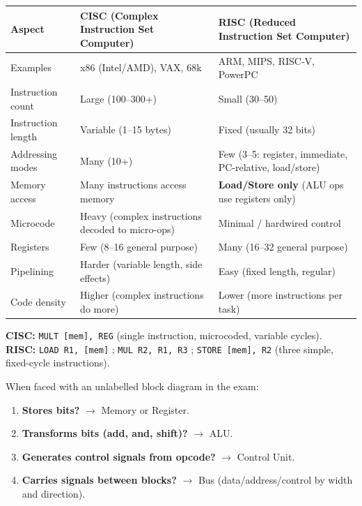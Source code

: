 \documentclass[11pt]{article}
\begin{document}
\begin{center}
\begin{tabularx}{\linewidth}{|l|X|X|}\hline
\rowcolor{popblueL}
\textbf{Aspect} & \textbf{CISC (Complex Instruction Set Computer)} & \textbf{RISC (Reduced Instruction Set Computer)} \\ \hline
Examples & x86 (Intel/AMD), VAX, 68k & ARM, MIPS, RISC-V, PowerPC \\ \hline
Instruction count & Large (100--300+) & Small (30--50) \\ \hline
Instruction length & Variable (1--15 bytes) & Fixed (usually 32 bits) \\ \hline
Addressing modes & Many (10+) & Few (3--5: register, immediate, PC-relative, load/store) \\ \hline
Memory access & Many instructions access memory & \textbf{Load/Store only} (ALU ops use registers only) \\ \hline
Microcode & Heavy (complex instructions decoded to micro-ops) & Minimal / hardwired control \\ \hline
Registers & Few (8--16 general purpose) & Many (16--32 general purpose) \\ \hline
Pipelining & Harder (variable length, side effects) & Easy (fixed length, regular) \\ \hline
Code density & Higher (complex instructions do more) & Lower (more instructions per task) \\ \hline
\end{tabularx}
\end{center}

\begin{exemplebox}
\textbf{CISC:} \texttt{MULT [mem], REG} (single instruction, microcoded, variable cycles).\\
\textbf{RISC:} \texttt{LOAD R1, [mem]} ; \texttt{MUL R2, R1, R3} ; \texttt{STORE [mem], R2} (three simple, fixed-cycle instructions).
\end{exemplebox}

\begin{methode}
When faced with an unlabelled block diagram in the exam:
\begin{enumerate}
\item \textbf{Stores bits?} $\rightarrow$ Memory or Register.
\item \textbf{Transforms bits (add, and, shift)?} $\rightarrow$ ALU.
\item \textbf{Generates control signals from opcode?} $\rightarrow$ Control Unit.
\item \textbf{Carries signals between blocks?} $\rightarrow$ Bus (data/address/control by width and direction).
\end{enumerate}
\end{methode}
\end{document}
